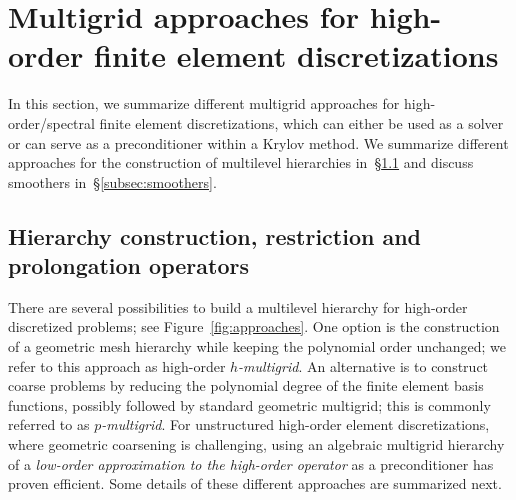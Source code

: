 \documentclass[smallcondensed,final]{svjour3}     %
\newcommand{\todo}[1]{\textcolor{red}{ #1}}
\begin{document}







\section{Multigrid approaches for high-order finite element discretizations}
\label{sec:approaches}

In this section, we summarize different multigrid approaches
for high-order/spectral finite element
discretizations, which can either be used as
a solver or can serve as a preconditioner within a Krylov method. We
summarize different approaches for the construction of
multilevel hierarchies in~\S\ref{subsec:hierarchy} and discuss
smoothers in~\S\ref{subsec:smoothers}.

\subsection{Hierarchy construction, restriction and prolongation operators}\label{subsec:hierarchy}
There are several possibilities to build a multilevel hierarchy for
high-order discretized problems; see Figure~\ref{fig:approaches}. One
option is the construction of a geometric mesh hierarchy while keeping
the polynomial order unchanged; we refer to this approach as
high-order \emph{$h$-multigrid}. An alternative is to construct coarse
problems by reducing the polynomial degree of the finite element basis
functions, possibly followed by standard geometric multigrid; this is
commonly referred to as \emph{$p$-multigrid}. For unstructured
high-order element discretizations, where geometric coarsening is
challenging, using an algebraic multigrid hierarchy of a
\emph{low-order approximation to the high-order operator} as a
preconditioner has proven efficient. Some details of
these different approaches are summarized next.
\end{document}
